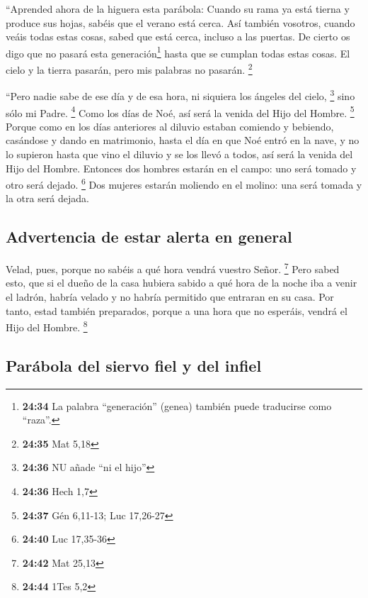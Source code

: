  ``Aprended ahora de la higuera esta parábola: Cuando su
rama ya está tierna y produce sus hojas, sabéis que el verano está
cerca.  Así también vosotros, cuando veáis todas estas
cosas, sabed que está cerca, incluso a las puertas.  De
cierto os digo que no pasará esta generación\footnote{\textbf{24:34} La
  palabra ``generación'' (genea) también puede traducirse como ``raza''.}
hasta que se cumplan todas estas cosas.  El cielo y la
tierra pasarán, pero mis palabras no pasarán. \footnote{\textbf{24:35}
  Mat 5,18}

 ``Pero nadie sabe de ese día y de esa hora, ni siquiera
los ángeles del cielo, \footnote{\textbf{24:36} NU añade ``ni el hijo''}
sino sólo mi Padre. \footnote{\textbf{24:36} Hech 1,7} 
Como los días de Noé, así será la venida del Hijo del Hombre.
\footnote{\textbf{24:37} Gén 6,11-13; Luc 17,26-27} 
Porque como en los días anteriores al diluvio estaban comiendo y
bebiendo, casándose y dando en matrimonio, hasta el día en que Noé entró
en la nave,  y no lo supieron hasta que vino el diluvio y
se los llevó a todos, así será la venida del Hijo del Hombre.
 Entonces dos hombres estarán en el campo: uno será
tomado y otro será dejado. \footnote{\textbf{24:40} Luc 17,35-36}
 Dos mujeres estarán moliendo en el molino: una será
tomada y la otra será dejada.

\hypertarget{advertencia-de-estar-alerta-en-general}{%
\subsection{Advertencia de estar alerta en
general}\label{advertencia-de-estar-alerta-en-general}}

 Velad, pues, porque no sabéis a qué hora vendrá vuestro
Señor. \footnote{\textbf{24:42} Mat 25,13}  Pero sabed
esto, que si el dueño de la casa hubiera sabido a qué hora de la noche
iba a venir el ladrón, habría velado y no habría permitido que entraran
en su casa.  Por tanto, estad también preparados, porque
a una hora que no esperáis, vendrá el Hijo del Hombre. \footnote{\textbf{24:44}
  1Tes 5,2}

\hypertarget{paruxe1bola-del-siervo-fiel-y-del-infiel}{%
\subsection{Parábola del siervo fiel y del
infiel}\label{paruxe1bola-del-siervo-fiel-y-del-infiel}}

